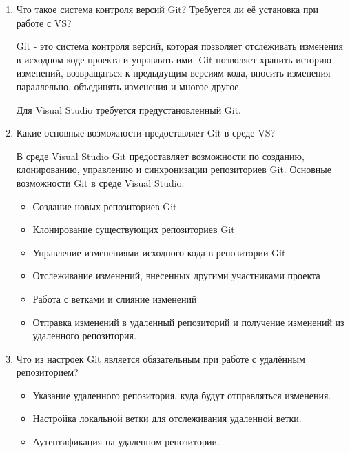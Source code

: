 \documentclass[a4paper,14pt]{extarticle}
\begin{document}
\begin{enumerate}
\item Что такое система контроля версий Git? Требуется ли её установка при работе с VS? 

Git - это система контроля версий,
которая позволяет отслеживать изменения
в исходном коде проекта и управлять ими.
Git позволяет хранить историю изменений,
возвращаться к предыдущим версиям кода, вносить изменения параллельно,
объединять изменения и многое другое.

Для Visual Studio требуется предустановленный Git.

\item Какие основные возможности предоставляет Git в среде VS? 

В среде Visual Studio Git предоставляет возможности по созданию, клонированию, управлению и синхронизации репозиториев Git. Основные возможности Git в среде Visual Studio:
\begin{itemize}
\item Создание новых репозиториев Git

\item Клонирование существующих репозиториев Git

\item Управление изменениями исходного кода в репозитории Git

\item Отслеживание изменений, внесенных другими участниками проекта

\item Работа с ветками и слияние изменений

\item Отправка изменений в удаленный репозиторий и получение изменений из удаленного репозитория.
\end{itemize}

\item Что из настроек Git является обязательным при работе с удалённым репозиторием? 

\begin{itemize}
\item Указание удаленного репозитория, куда будут отправляться изменения.

\item Настройка локальной ветки для отслеживания удаленной ветки.

\item Аутентификация на удаленном репозитории.
\end{itemize}


\end{enumerate}
\end{document}
